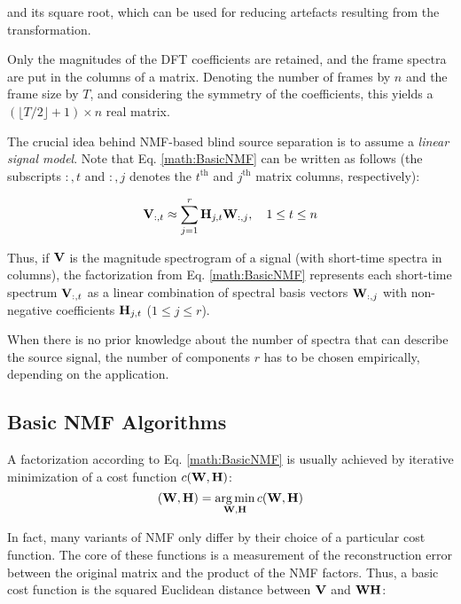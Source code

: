 and its square root, which can be used for reducing artefacts resulting from
the transformation.

Only the magnitudes of the DFT coefficients are retained, and the frame spectra
are put in the columns of a matrix. Denoting the number of frames by $n$ and
the frame size by $T$, and considering the symmetry of the coefficients, this
yields a $\left( \lfloor T/2 \rfloor +1 \right) \times n$ real matrix. 

The crucial idea behind NMF-based blind source separation is to assume a
\emph{linear signal model}. Note that Eq. \ref{math:BasicNMF} can be written as
follows (the subscripts $:,t$ and $:,j$ denotes the $t^{\textrm{th}}$ and
$j^{\textrm{th}}$ matrix columns, respectively):

\begin{equation}
    \label{math:LinSigMod}
    \mathbf{V}_{:,t} \approx \sum\limits_{j=1}^r \mathbf{H}_{j,t} \mathbf{W}_{:,j}, \quad 1 \leq t \leq n
\end{equation}

Thus, if $\mathbf{V}$ is the magnitude spectrogram of a signal (with short-time spectra
in columns), the factorization from Eq. \ref{math:BasicNMF} represents each short-time spectrum
$\mathbf{V}_{:,t}$ as a linear combination of spectral basis vectors
$\mathbf{W}_{:,j}$ with non-negative coefficients
$\mathbf{H}_{j,t}$ ($1 \leq j \leq r$). 


When there is no prior knowledge about the number of spectra that can describe
the source signal, the number of components $r$ has to be chosen empirically,
depending on the application.

\subsection{Basic NMF Algorithms}
\label{section:NMFAlg}

A factorization according to Eq. \ref{math:BasicNMF} is usually achieved by
iterative minimization of a cost function $c(\mathbf{W},\mathbf{H})$:
\begin{equation}
    \label{math:minimi}
    (\mathbf{W},\mathbf{H}) = \operatorname*{arg\,min}\limits_{\mathbf{W},\mathbf{H}} c(\mathbf{W},\mathbf{H}) 
\end{equation}

In fact, many variants of NMF only differ by their choice of a particular cost
function.  The core of these functions is a measurement of the reconstruction
error between the original matrix and the product of the NMF factors.  Thus, a
basic cost function is the squared Euclidean distance between $\mathbf{V}$ and
$\mathbf{WH}$:

